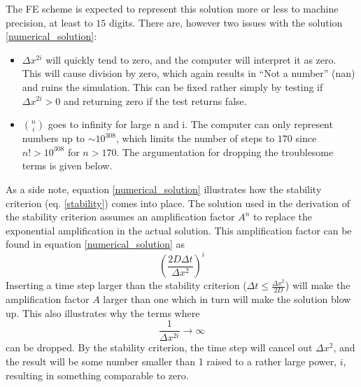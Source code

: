 The FE scheme is expected to represent this solution more or less to machine precision, at least to $15$ digits. 
There are, however two issues with the solution \eqref{numerical_solution}:
\begin{itemize}
 \item $\Delta x^{2i}$ will quickly tend to zero, and the computer will interpret it as zero. This will cause division by zero, which again results in ``Not a number'' (nan) and ruins the simulation. This can be fixed rather simply by testing if $\Delta x^{2i}>0$ and returning zero if the test returns false.
 \item ${n\choose i}$ goes to infinity for large n and i. The computer can only represent numbers up to $\sim10^{308}$, which limits the number of steps to $170$ since $n!>10^{308}$ for $n>170$. 
 The argumentation for dropping the troublesome terms is given below.
\end{itemize}

As a side note, equation \eqref{numerical_solution} illustrates how the stability criterion (eq. \ref{stability}) comes into place. 
The solution used in the derivation of the stability criterion assumes an amplification factor $A^n$ to replace the exponential amplification in the actual solution. 
This amplification factor can be found in equation \eqref{numerical_solution} as 
$$\left(\frac{2D\Delta t}{\Delta x^2}\right)^i$$
Inserting a time step larger than the stability criterion ($\Delta t \leq \frac{\Delta x^2}{2D}$) will make the amplification factor $A$ larger than one which in turn will make the solution blow up.
This also illustrates why the terms where 
$$ \frac{1}{\Delta x^{2i}} \to \infty$$
 can be dropped. 
 By the stability criterion, the time step will cancel out $\Delta x^2$, and the result will be some number smaller than 1 raised to a rather large power, $i$, resulting in something comparable to zero.\\
% 

